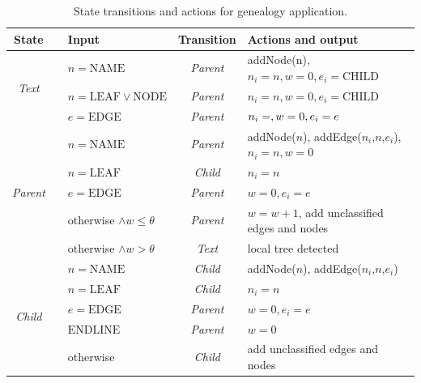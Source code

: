 \documentclass{llncs}
\begin{document}
\begin{table}[bt]
\centering
\caption{State transitions and actions for genealogy application.}
\begin{tabular}{cp{.1cm}p{1.1in}cp{2.4in}}
State & & Input & Transition & Actions and output \\ \hline
\multirow{3}{*}{\em Text} 
&  & $n=\mbox{NAME}$                   & {\em Parent} & addNode(n), $n_i = n, w = 0, e_i=\mbox{CHILD}$ \\ \cline{3-5}
&  & $n=\mbox{LEAF} \vee \mbox{NODE}$ & {\em Parent} & $n_i = n, w = 0, e_i=\mbox{CHILD}$ \\ \cline{3-5}
&  & $e=\mbox{EDGE}$                   & {\em Parent} & $n_i = \empty, w = 0, e_i=e$ \\ \hline
\multirow{5}{*}{\em Parent} 
&  & $n=\mbox{NAME}$                   & {\em Parent} & addNode($n$), addEdge($n_i$,$n$,$e_i$), $n_i = n, w = 0$ \\ \cline{3-5}
&  & $n=\mbox{LEAF}$                   & {\em Child}  & $n_i = n$ \\ \cline{3-5}
&  & $e=\mbox{EDGE}$                   & {\em Parent} & $w = 0, e_i=e$ \\ \cline{3-5}
&  & otherwise $\wedge w \le \theta$   & {\em Parent} & $w=w+1$, add unclassified edges and nodes \\ \cline{3-5}
&  & otherwise $\wedge w > \theta$     & {\em Text}   & local tree detected \\ \hline
\multirow{5}{*}{\em Child} 
&  & $n=\mbox{NAME}$                   & {\em Child}  & addNode($n$), addEdge($n_i$,$n$,$e_i$) \\ \cline{3-5}
&  & $n=\mbox{LEAF}$                   & {\em Child}  & $n_i = n$ \\ \cline{3-5}
&  & $e=\mbox{EDGE}$                   & {\em Parent} & $w = 0, e_i=e$ \\ \cline{3-5}
&  & $\mbox{ENDLINE}$                  & {\em Parent} & $w = 0$ \\ \cline{3-5}
&  & otherwise                         & {\em Child}  & add unclassified edges and nodes \\ \hline
\end{tabular}
\label{t:genefst}
\end{table}
\end{document}
